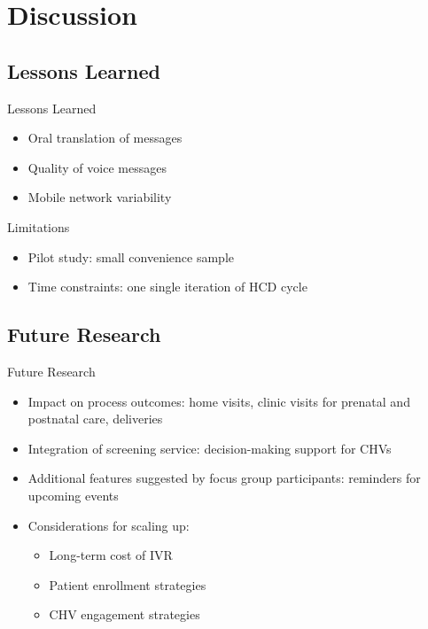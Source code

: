 \documentclass[xcolor=x11names, handout, compress]{beamer}
\renewcommand{\(}{\begin{columns}}
\renewcommand{\)}{\end{columns}}
\newcommand{\<}[1]{\begin{column}{#1}}
\renewcommand{\>}{\end{column}}
\begin{document}
\section{Discussion}
\subsection{Lessons Learned}
\begin{frame}{Lessons Learned}
\begin{itemize}
\item{Oral translation of messages}
\item{Quality of voice messages}
\item{Mobile network variability}
\end{itemize}
\end{frame}

\begin{frame}{Limitations}
\begin{itemize}
\item{Pilot study: small convenience sample}
\item{Time constraints: one single iteration of HCD cycle}
\end{itemize}
\end{frame}

\subsection{Future Research}
\begin{frame}{Future Research}
\begin{itemize}
\item{Impact on process outcomes: home visits, clinic visits for prenatal and postnatal care, deliveries}
\item{Integration of screening service: decision-making support for CHVs}
\item{Additional features suggested by focus group participants: reminders for upcoming events}
\item{Considerations for scaling up:}
\begin{itemize}
\item{Long-term cost of IVR}
\item{Patient enrollment strategies}
\item{CHV engagement strategies}
\end{itemize}
\end{itemize}
\end{frame}


\end{document}
